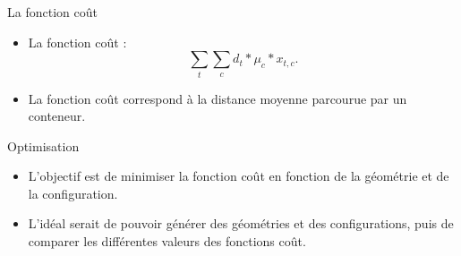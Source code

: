 \begin{frame}{La fonction coût}
\vfill
\begin{itemize}
    \item  La fonction coût  : 
    \vfill
    $$ \sum_t \sum_c d_t* \mu_c* x_{t,c}.  $$
      \vfill
     \item La fonction coût correspond à la distance moyenne parcourue par un conteneur.
\end{itemize}
     \vfill
\end{frame}

\begin{frame}{Optimisation}

\vfill
\begin{itemize}
    \item L'objectif est de minimiser la fonction coût en fonction de la géométrie et de la configuration.
     \vfill
     \item  L'idéal serait de pouvoir générer des géométries et des configurations, puis de comparer les différentes valeurs des fonctions coût. 
     
\end{itemize}
     \vfill
    
\end{frame}

% 